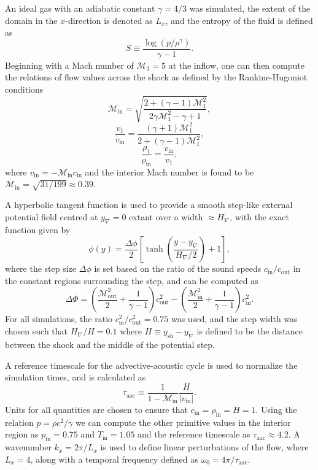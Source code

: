 An ideal gas with an adiabatic constant $\gamma=4/3$ was simulated, the extent of the domain in the $x$-direction is denoted as $L_x$, and the entropy of the fluid is defined as
\begin{equation}
S\equiv\frac{\log\left(p/\rho^\gamma\right)}{\gamma-1}.
\end{equation}
Beginning with a Mach number of $\mathcal{M}_1=5$ at the inflow, one can then compute the relations of flow values across the shock as defined by the Rankine-Hugoniot conditions
\begin{equation}
\mathcal{M}_\textrm{in}=\sqrt{\frac{2+(\gamma-1)\mathcal{M}_1^2}{2\gamma\mathcal{M}_1^2-\gamma+1}},
\end{equation}
\begin{equation}
\frac{v_1}{v_\textrm{in}}=\frac{(\gamma+1)\mathcal{M}_1^2}{2+(\gamma-1)\mathcal{M}_1^2},
\end{equation}
\begin{equation}
\frac{\rho_1}{\rho_\textrm{in}}=\frac{v_\textrm{in}}{v_1},
\end{equation}
where $v_\textrm{in}=-\mathcal{M}_\textrm{in}c_\textrm{in}$ and the interior Mach number is found to be $\mathcal{M}_\textrm{in}=\sqrt{31/199}\approx0.39$.

A hyperbolic tangent function is used to provide a smooth step-like external potential field centred at $y_\nabla=0$ extant over a width $\approx H_\nabla$, with the exact function given by
\begin{equation}
\phi(y)=\frac{\Delta\phi}{2}\left[\tanh\left(\frac{y-y_{\nabla}}{H_{\nabla}/2}\right)+1\right],
\end{equation}
where the step size $\Delta\phi$ is set based on the ratio of the sound speeds $c_{\textrm{in}}/c_{\textrm{out}}$ in the constant regions surrounding the step, and can be computed as
\begin{equation}
\Delta\Phi=\left(\frac{\mathcal{M}_\textrm{out}^2}{2}+\frac{1}{\gamma-1}\right)c_\textrm{out}^2-\left(\frac{\mathcal{M}_\textrm{in}^2}{2}+\frac{1}{\gamma-1}\right)c_\textrm{in}^2.
\end{equation}
For all simulations, the ratio $c_\textrm{in}^2/c_\textrm{out}^2=0.75$ was used, and the step width was chosen such that $H_\nabla/H=0.1$ where $H\equiv y_\textrm{sh}-y_\nabla$ is defined to be the distance between the shock and the middle of the potential step.

A reference timescale for the advective-acoustic cycle is used to normalize the simulation times, and is calculated as
\begin{equation}
\tau_\textrm{aac}\equiv\frac{1}{1-\mathcal{M}_\textrm{in}}\frac{H}{|v_\textrm{in}|}.
\end{equation}
Units for all quantities are chosen to ensure that $c_\textrm{in}=\rho_\textrm{in}=H=1$. Using the relation $p=\rho c^2/\gamma$ we can compute the other primitive values in the interior region as $p_\textrm{in}=0.75$ and $T_\textrm{in}=1.05$ and the reference timescale as $\tau_\textrm{aac}\approx4.2$. A wavenumber $k_x=2\pi/L_x$ is used to define linear perturbations of the flow, where $L_x=4$, along with a temporal frequency defined as $\omega_0=4\pi/\tau_\textrm{aac}$.

